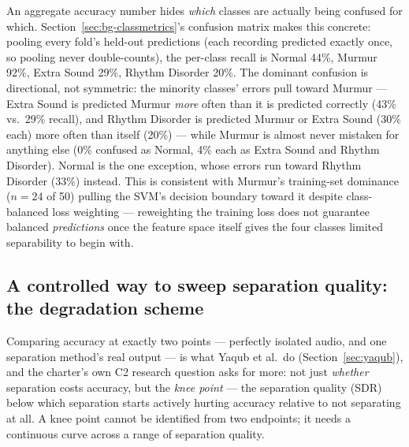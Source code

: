 \documentclass[11pt]{article}
\begin{document}
An aggregate accuracy number hides \emph{which} classes are actually being
confused for which. Section~\ref{sec:bg-classmetrics}'s confusion matrix
makes this concrete: pooling every fold's held-out predictions (each
recording predicted exactly once, so pooling never double-counts), the
per-class recall is Normal 44\%, Murmur 92\%, Extra Sound 29\%, Rhythm
Disorder 20\%. The dominant confusion is directional, not symmetric: the
minority classes' errors pull toward Murmur --- Extra Sound is predicted
Murmur \emph{more} often than it is predicted correctly (43\% vs.\ 29\%
recall), and Rhythm Disorder is predicted Murmur or Extra Sound (30\% each)
more often than itself (20\%) --- while Murmur is almost never mistaken
for anything else (0\% confused as Normal, 4\% each as Extra Sound and
Rhythm Disorder). Normal is the one exception, whose errors run toward
Rhythm Disorder (33\%) instead. This is consistent with Murmur's
training-set dominance ($n{=}24$ of 50) pulling the SVM's decision
boundary toward it despite class-balanced loss weighting --- reweighting
the training loss does not guarantee balanced \emph{predictions} once the
feature space itself gives the four classes limited separability to begin
with.

\subsection{A controlled way to sweep separation quality: the degradation scheme}
\label{sec:degradation}

Comparing accuracy at exactly two points --- perfectly isolated audio, and
one separation method's real output --- is what Yaqub et al.\ do
(Section~\ref{sec:yaqub}), and the charter's own C2 research question asks
for more: not just \emph{whether} separation costs accuracy, but the
\emph{knee point} --- the separation quality (SDR) below which separation
starts actively hurting accuracy relative to not separating at all. A knee
point cannot be identified from two endpoints; it needs a continuous curve
across a range of separation quality.
\end{document}
